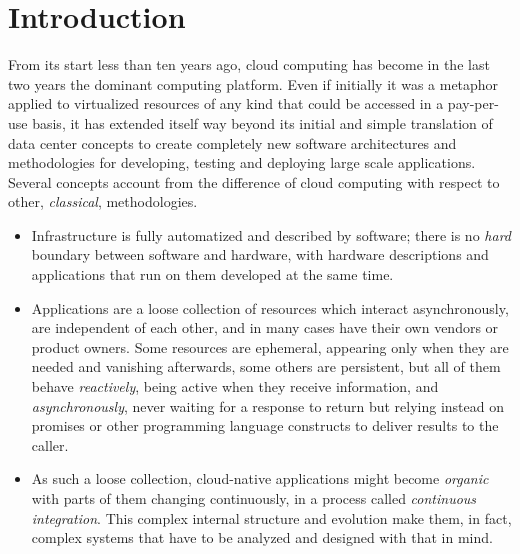 \documentclass[utf8]{frontiersSCNS} %
\begin{document}
\section{Introduction}

From its start less than ten years ago, cloud computing
\citep{armbrust2010view,qian2009cloud} has become in the last two
years the dominant computing platform. Even if initially it was a
metaphor applied to virtualized resources of any kind that could be
accessed in a pay-per-use basis, it has extended itself way beyond its
initial and simple translation of data center concepts to create
completely new software architectures and methodologies for
developing, testing and deploying large scale applications. Several
concepts account from the difference of cloud computing with respect
to other, {\em classical}, methodologies.


\begin{itemize}

\item Infrastructure is fully automatized and described by software;
  there is no {\em hard} boundary between software and hardware, with
  hardware descriptions and applications that run on them
  developed at the same time.

\item Applications are a loose collection of resources which interact
  asynchronously, are independent of each other, and in many cases
  have their own vendors or product owners. Some resources are
  ephemeral, appearing only when they are needed and vanishing afterwards,
  some others are persistent, but all of them behave {\em reactively},
  being active when %
  they receive information, and {\em asynchronously}, never waiting for a
  response to return but relying instead on promises or other
  programming language constructs to deliver results to the caller.

\item  As such a loose collection, cloud-native applications might
  become {\em organic} with parts of them changing continuously, in a
  process called {\em continuous integration}. This complex internal
  structure and evolution make them, in fact, complex systems that
  have to be analyzed and designed with that in mind.
\end{itemize}
\end{document}
